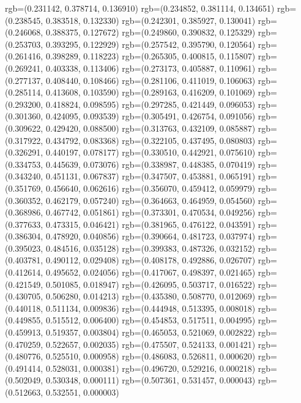 {{{					rgb=(0.231142, 0.378714, 0.136910)
					rgb=(0.234852, 0.381114, 0.134651)
					rgb=(0.238545, 0.383518, 0.132330)
					rgb=(0.242301, 0.385927, 0.130041)
					rgb=(0.246068, 0.388375, 0.127672)
					rgb=(0.249860, 0.390832, 0.125329)
					rgb=(0.253703, 0.393295, 0.122929)
					rgb=(0.257542, 0.395790, 0.120564)
					rgb=(0.261416, 0.398289, 0.118223)
					rgb=(0.265305, 0.400815, 0.115807)
					rgb=(0.269241, 0.403338, 0.113406)
					rgb=(0.273173, 0.405887, 0.110961)
					rgb=(0.277137, 0.408440, 0.108466)
					rgb=(0.281106, 0.411019, 0.106063)
					rgb=(0.285114, 0.413608, 0.103590)
					rgb=(0.289163, 0.416209, 0.101069)
					rgb=(0.293200, 0.418824, 0.098595)
					rgb=(0.297285, 0.421449, 0.096053)
					rgb=(0.301360, 0.424095, 0.093539)
					rgb=(0.305491, 0.426754, 0.091056)
					rgb=(0.309622, 0.429420, 0.088500)
					rgb=(0.313763, 0.432109, 0.085887)
					rgb=(0.317922, 0.434792, 0.083368)
					rgb=(0.322105, 0.437495, 0.080803)
					rgb=(0.326291, 0.440197, 0.078177)
					rgb=(0.330510, 0.442921, 0.075610)
					rgb=(0.334753, 0.445639, 0.073076)
					rgb=(0.338987, 0.448385, 0.070419)
					rgb=(0.343240, 0.451131, 0.067837)
					rgb=(0.347507, 0.453881, 0.065191)
					rgb=(0.351769, 0.456640, 0.062616)
					rgb=(0.356070, 0.459412, 0.059979)
					rgb=(0.360352, 0.462179, 0.057240)
					rgb=(0.364663, 0.464959, 0.054560)
					rgb=(0.368986, 0.467742, 0.051861)
					rgb=(0.373301, 0.470534, 0.049256)
					rgb=(0.377633, 0.473315, 0.046421)
					rgb=(0.381965, 0.476122, 0.043591)
					rgb=(0.386304, 0.478920, 0.040856)
					rgb=(0.390664, 0.481723, 0.037974)
					rgb=(0.395023, 0.484516, 0.035128)
					rgb=(0.399383, 0.487326, 0.032152)
					rgb=(0.403781, 0.490112, 0.029408)
					rgb=(0.408178, 0.492886, 0.026707)
					rgb=(0.412614, 0.495652, 0.024056)
					rgb=(0.417067, 0.498397, 0.021465)
					rgb=(0.421549, 0.501085, 0.018947)
					rgb=(0.426095, 0.503717, 0.016522)
					rgb=(0.430705, 0.506280, 0.014213)
					rgb=(0.435380, 0.508770, 0.012069)
					rgb=(0.440118, 0.511134, 0.009836)
					rgb=(0.444948, 0.513395, 0.008018)
					rgb=(0.449855, 0.515512, 0.006400)
					rgb=(0.454853, 0.517511, 0.004995)
					rgb=(0.459913, 0.519357, 0.003804)
					rgb=(0.465053, 0.521069, 0.002822)
					rgb=(0.470259, 0.522657, 0.002035)
					rgb=(0.475507, 0.524133, 0.001421)
					rgb=(0.480776, 0.525510, 0.000958)
					rgb=(0.486083, 0.526811, 0.000620)
					rgb=(0.491414, 0.528031, 0.000381)
					rgb=(0.496720, 0.529216, 0.000218)
					rgb=(0.502049, 0.530348, 0.000111)
					rgb=(0.507361, 0.531457, 0.000043)
					rgb=(0.512663, 0.532551, 0.000003)
}}}
